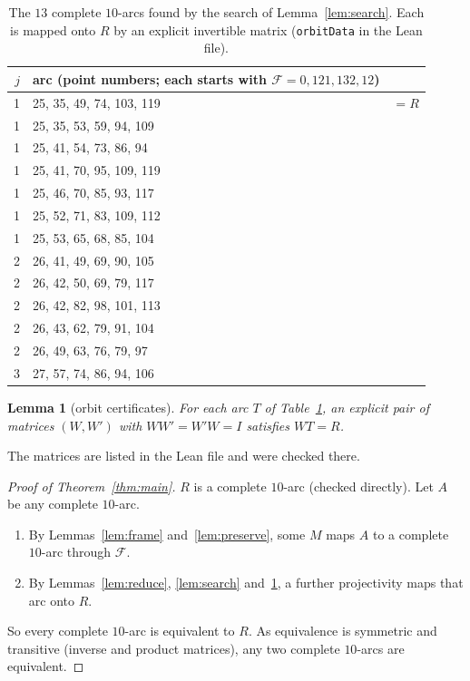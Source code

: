 \documentclass[11pt]{article}
\newtheorem{lemma}[theorem]{Lemma}
\theoremstyle{definition}
\theoremstyle{remark}
\begin{document}
\begin{table}[ht]\centering\small
\begin{tabular}{@{}rll@{}}
\toprule
$j$ & arc (point numbers; each starts with $\mathcal F=0,121,132,12$) & \\
\midrule
1 & 25, 35, 49, 74, 103, 119 & $=R$\\
1 & 25, 35, 53, 59, 94, 109 &\\
1 & 25, 41, 54, 73, 86, 94 &\\
1 & 25, 41, 70, 95, 109, 119 &\\
1 & 25, 46, 70, 85, 93, 117 &\\
1 & 25, 52, 71, 83, 109, 112 &\\
1 & 25, 53, 65, 68, 85, 104 &\\
2 & 26, 41, 49, 69, 90, 105 &\\
2 & 26, 42, 50, 69, 79, 117 &\\
2 & 26, 42, 82, 98, 101, 113 &\\
2 & 26, 43, 62, 79, 91, 104 &\\
2 & 26, 49, 63, 76, 79, 97 &\\
3 & 27, 57, 74, 86, 94, 106 &\\
\bottomrule
\end{tabular}
\caption{The $13$ complete $10$-arcs found by the search of
Lemma~\ref{lem:search}. Each is mapped onto $R$ by an explicit invertible matrix
(\texttt{orbitData} in the Lean file).}\label{tab:arcs}
\end{table}

\begin{lemma}[orbit certificates]\label{lem:cert}
For each arc $T$ of Table~\ref{tab:arcs}, an explicit pair of matrices $(W,W')$
with $WW'=W'W=I$ satisfies $WT=R$.
\end{lemma}
The matrices are listed in the Lean file and were checked there.

\begin{proof}[Proof of Theorem~\ref{thm:main}]
$R$ is a complete $10$-arc (checked directly). Let $A$ be any complete
$10$-arc.
\begin{enumerate}
\item By Lemmas~\ref{lem:frame} and~\ref{lem:preserve}, some $M$ maps $A$ to a
complete $10$-arc through $\mathcal F$.
\item By Lemmas~\ref{lem:reduce}, \ref{lem:search} and~\ref{lem:cert}, a
further projectivity maps that arc onto $R$.
\end{enumerate}
So every complete $10$-arc is equivalent to $R$. As equivalence is symmetric
and transitive (inverse and product matrices), any two complete $10$-arcs are
equivalent.
\end{proof}
\end{document}
